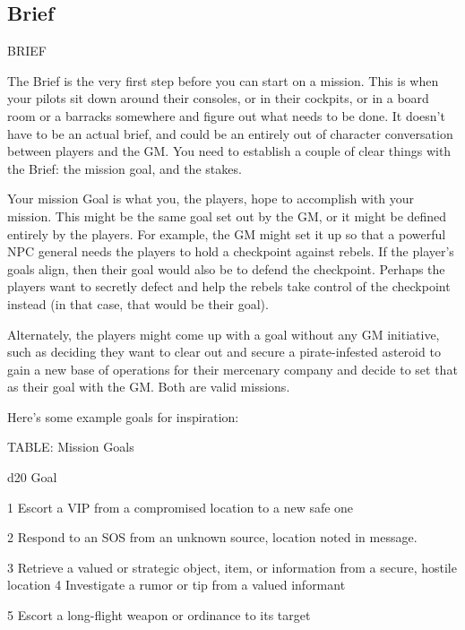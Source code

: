 \subsection{Brief}
                                                     BRIEF
 

The Brief is the very first step before you can start on a mission. This is when your pilots sit down  
around their consoles, or in their cockpits, or in a board room or a barracks somewhere and  
figure out what needs to be done. It doesn’t have to be an actual brief, and could be an entirely  
out of character conversation between players and the GM. You need to establish a couple of  
clear things with the Brief: the mission goal, and the stakes.
 

Your mission Goal is what you, the players, hope to accomplish with your mission. This might be  
the same goal set out by the GM, or it might be defined entirely by the players. For example, the  
GM might set it up so that a powerful NPC general needs the players to hold a checkpoint  
against rebels. If the player’s goals align, then their goal would also be to defend the checkpoint.  
Perhaps the players want to secretly defect and help the rebels take control of the checkpoint  
instead (in that case, that would be their goal).
 

Alternately, the players might come up with a goal without any GM initiative, such as deciding  
they want to clear out and secure a pirate-infested asteroid to gain a new base of operations for  
their mercenary company and decide to set that as their goal with the GM. Both are valid  
missions.
 

                                                                                                                 


Here’s some example goals for inspiration:
 

TABLE: Mission Goals
 

 d20       Goal 

 1         Escort a VIP from a compromised location to a new safe one 

 2         Respond to an SOS from an unknown source, location noted in message.  

 3         Retrieve a valued or strategic object, item, or information from a secure, hostile  
           location 
 4         Investigate a rumor or tip from a valued informant  

 5         Escort a long-flight weapon or ordinance to its target  

